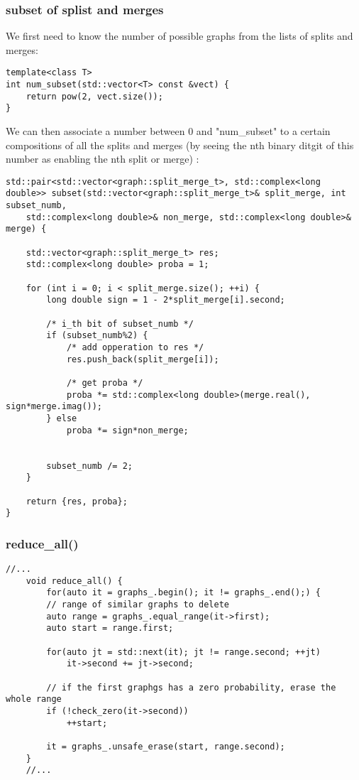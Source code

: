 \documentclass[11pt]{article}
\begin{document}
\subsubsection{subset of splist and merges}

We first need to know the number of possible graphs from the lists of splits and merges:

\begin{lstlisting}[style=CStyle]
template<class T>
int num_subset(std::vector<T> const &vect) {
	return pow(2, vect.size());
}
\end{lstlisting}

We can then associate a number between 0 and "num\_subset" to a certain compositions of all the splits and merges (by seeing the nth binary ditgit of this number as enabling the nth split or merge) :

\begin{lstlisting}[style=CStyle]
std::pair<std::vector<graph::split_merge_t>, std::complex<long double>> subset(std::vector<graph::split_merge_t>& split_merge, int subset_numb,
	std::complex<long double>& non_merge, std::complex<long double>& merge) {
	
	std::vector<graph::split_merge_t> res;
	std::complex<long double> proba = 1;

	for (int i = 0; i < split_merge.size(); ++i) {
		long double sign = 1 - 2*split_merge[i].second;

		/* i_th bit of subset_numb */
		if (subset_numb%2) {
			/* add opperation to res */
			res.push_back(split_merge[i]);

			/* get proba */
			proba *= std::complex<long double>(merge.real(), sign*merge.imag());
		} else
			proba *= sign*non_merge;


		subset_numb /= 2;
	}

	return {res, proba};
}
\end{lstlisting}

\subsubsection{reduce\_all()}

\begin{lstlisting}[style=CStyle]
	//...
	void reduce_all() {
		for(auto it = graphs_.begin(); it != graphs_.end();) {
    	// range of similar graphs to delete
    	auto range = graphs_.equal_range(it->first);
    	auto start = range.first;

    	for(auto jt = std::next(it); jt != range.second; ++jt)
        	it->second += jt->second;

    	// if the first graphgs has a zero probability, erase the whole range
    	if (!check_zero(it->second))
    		++start;

    	it = graphs_.unsafe_erase(start, range.second);
	}
	//...
\end{lstlisting}
\end{document}
